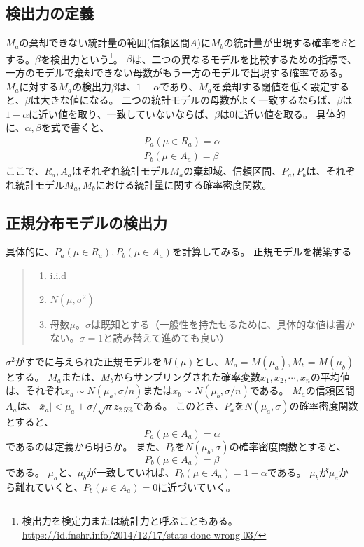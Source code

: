 \subsection{検出力の定義}
$M_a$の棄却できない統計量の範囲(信頼区間$A$)に$M_b$の統計量が出現する確率を$\beta$とする。$\beta$を検出力という\footnote{検出力を検定力または統計力と呼ぶこともある。\\ \url{https://id.fnshr.info/2014/12/17/stats-done-wrong-03/}}。
$\beta$は、二つの異なるモデルを比較するための指標で、一方のモデルで棄却できない母数がもう一方のモデルで出現する確率である。
$M_a$に対する$M_a$の検出力$\beta$は、$1-\alpha$であり、$M_a$を棄却する閾値を低く設定すると、$\beta$は大きな値になる。
二つの統計モデルの母数がよく一致するならば、$\beta$は$1-\alpha$に近い値を取り、一致していないならば、$\beta$は0に近い値を取る。
具体的に、$\alpha,\beta$を式で書くと、
\begin{eqnarray*}
    P_a(\mu \in R_a) = \alpha\\
    P_b(\mu \in A_a) = \beta
\end{eqnarray*}
ここで、$R_a,A_a$はそれぞれ統計モデル$M_a$の棄却域、信頼区間、$P_a,P_b$は、それぞれ統計モデル$M_a,M_b$における統計量に関する確率密度関数。

\subsection{正規分布モデルの検出力}
具体的に、$P_a(\mu \in R_a),P_b(\mu\in A_a)$を計算してみる。
正規モデルを構築する
\begin{quote}
    \begin{enumerate}[(1)]
\item i.i.d
\item $N(\mu,\sigma^2)$
\item 母数$\mu$。$\sigma$は既知とする（一般性を持たせるために、具体的な値は書かない。$\sigma=1$と読み替えて進めても良い）
\end{enumerate}
\end{quote}
\fi
$\sigma^2$がすでに与えられた正規モデルを$M(\mu)$とし、$M_a=M(\mu_a),M_b=M(\mu_b)$とする。
$M_a$または、$M_b$からサンプリングされた確率変数$x_1,x_2,\cdots,x_n$の平均値は、それぞれ$\bar{x}_a\sim N(\mu_a,\sigma/n)$または$\bar{x}_b\sim N(\mu_b,\sigma/n)$である。
$M_a$の信頼区間$A_a$は、$|\bar{x}_a|<\mu_a+\sigma / \sqrt{n}z_{2.5\%}$である。
このとき、$P_a$を$N(\mu_a,\sigma)$の確率密度関数とすると、
\begin{equation*}
    P_a(\mu \in A_a) = \alpha
\end{equation*}
であるのは定義から明らか。
また、$P_b$を$N(\mu_b,\sigma)$の確率密度関数とすると、
\begin{equation*}
    P_b(\mu \in A_a ) = \beta
\end{equation*}
である。
$\mu_a$と、$\mu_b$が一致していれば、$P_b(\mu \in A_a ) = 1-\alpha$である。
$\mu_b$が$\mu_a$から離れていくと、$P_b(\mu \in A_a)=0$に近づいていく。


